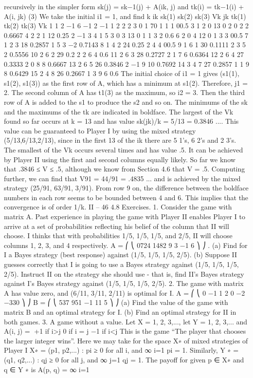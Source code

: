 \documentclass[]{report}
\begin{document}
recursively in the simpler form
sk(j) = sk−1(j) + A(ik, j) and tk(i) = tk−1(i) + A(i, jk) (3)
We take the initial i1 = 1, and find
k ik sk(1) sk(2) sk(3) Vk jk tk(1) tk(2) tk(3) Vk
1 1 2 −1 6 −1 2 −1 1 2 2
2 3 0 1 70 1 1 1 00.5
3 1 2 0 13 0 2 0 2 2 0.6667
4 2 2 1 12 0.25 2 −1 3 4 1
5 3 0 3 13 0 1 1 3 2 0.6
6 2 0 4 12 0 1 3 3 00.5
7 1 2 3 18 0.2857 1 5 3 −2 0.7143
8 1 4 2 24 0.25 2 4 4 00.5
9 1 6 1 30 0.1111 2 3 5 2 0.5556
10 2 6 2 29 0.2 2 2 6 4 0.6
11 2 6 3 28 0.2727 2 1 7 6 0.6364
12 2 6 4 27 0.3333 2 0 8 8 0.6667
13 2 6 5 26 0.3846 2 −1 9 10 0.7692
14 3 4 7 27 0.2857 1 1 9 8 0.6429
15 2 4 8 26 0.2667 1 3 9 6 0.6
The initial choice of i1 = 1 gives (s1(1), s1(2), s1(3)) as the first row of A, which has a
minimum at s1(2). Therefore, j1 = 2. The second column of A has t1(3) as the maximum,
so i2 = 3. Then the third row of A is added to the s1 to produce the s2 and so on. The
minimums of the sk and the maximums of the tk are indicated in boldface. The largest
of the Vk found so far occurs at k = 13 and has value sk(jk)/k = 5/13 = 0.3846 .... This
value can be guaranteed to Player I by using the mixed strategy (5/13,6/13,2/13), since in
the first 13 of the ik there are 5 1’s, 6 2’s and 2 3’s. The smallest of the Vk occurs several
times and has value .5. It can be achieved by Player II using the first and second columns
equally likely. So far we know that .3846 ≤ V ≤ .5, although we know from Section 4.6
that V = .5.
Computing further, we can find that V91 = 44/91 = .4835 ... and is achieved by
the mixed strategy (25/91, 63/91, 3/91). From row 9 on, the difference between the boldface
numbers in each row seems to be bounded between 4 and 6. This implies that the
convergence is of order 1/k.
II – 46
4.8 Exercises.
1. Consider the game with matrix A. Past experience in playing the game with Player
II enables Player I to arrive at a set of probabilities reflecting his belief of the column that II
will choose. I thinks that with probabilities 1/5, 1/5, 1/5, and 2/5, II will choose columns
1, 2, 3, and 4 respectively.
A =
⎛
⎝
0724
1482
9 3 −1 6
⎞
⎠ .
(a) Find for I a Bayes strategy (best response) against (1/5, 1/5, 1/5, 2/5).
(b) Suppose II guesses correctly that I is going to use a Bayes strategy against
(1/5, 1/5, 1/5, 2/5). Instruct II on the strategy she should use - that is, find II’s Bayes
strategy against I’s Bayes strategy against (1/5, 1/5, 1/5, 2/5).
2. The game with matrix A has value zero, and (6/11, 3/11, 2/11) is optimal for I.
A =
⎛
⎝
0 −1 1
2 0 −2
−330
⎞
⎠ B =
⎛
⎝
537
951
−1 11 5
⎞
⎠
(a) Find the value of the game with matrix B and an optimal strategy for I.
(b) Find an optimal strategy for II in both games.
3. A game without a value. Let X = {1, 2, 3,...}, let Y = {1, 2, 3,...} and
A(i, j) =  +1 if i>j
0 if i = j
−1 if i<j
This is the game “The player that chooses the larger integer wins”. Here we may take for
the space X∗ of mixed strategies of Player I
X∗ = {(p1, p2,...) : pi ≥ 0 for all i, and 
∞
i=1
pi = 1}.
Similarly,
Y ∗ = {(q1, q2,...) : qj ≥ 0 for all j, and 
∞
j=1
qj = 1}.
The payoff for given p ∈ X∗ and q ∈ Y ∗ is
A(p, q) = 
∞
i=1
\end{document}
